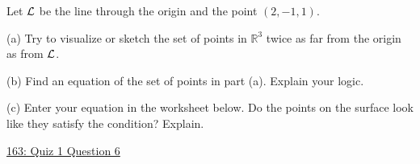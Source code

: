 \documentclass{ximera}
\begin{document}
\begin{question}  \label{Qpdfdsfe032}
Let ${\cal L}$ be the line through the origin and the point $(2,-1,1)$.

(a) Try to visualize or sketch the set of points in $\mathbb{R}^3$  twice as far from the origin as from ${\cal L}$.

(b) Find an equation of the set of points in part (a). Explain your logic.

(c) Enter  your equation in the worksheet below. Do the points on the surface look like they satisfy the condition? Explain.

\begin{onlineOnly}
    \begin{center}
\end{center}
\end{onlineOnly}

\href{https://www.desmos.com/3d/wzv6plrbe6}{163: Quiz 1 Question 6}
\end{question}
\end{document}
